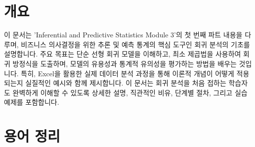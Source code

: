 \documentclass[11pt,a4paper]{article}
\begin{document}
\newpage
\section*{개요}

이 문서는 'Inferential and Predictive Statistics Module 3'의 첫 번째 파트 내용을 다루며, 비즈니스 의사결정을 위한 추론 및 예측 통계의 핵심 도구인 회귀 분석의 기초를 설명합니다.
주요 목표는 단순 선형 회귀 모델을 이해하고, 최소 제곱법을 사용하여 회귀 방정식을 도출하며, 모델의 유용성과 통계적 유의성을 평가하는 방법을 배우는 것입니다.
특히, Excel을 활용한 실제 데이터 분석 과정을 통해 이론적 개념이 어떻게 적용되는지 실질적인 예시와 함께 제시합니다.
이 문서는 회귀 분석을 처음 접하는 학습자도 완벽하게 이해할 수 있도록 상세한 설명, 직관적인 비유, 단계별 절차, 그리고 실습 예제를 포함합니다.

\newpage
\section*{용어 정리}
\end{document}
